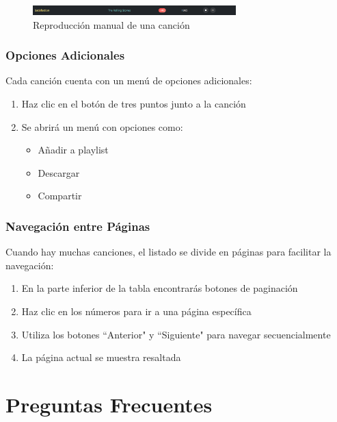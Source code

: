 \documentclass[a4paper,12pt]{article}
\begin{document}
\begin{figure}[h]
    \centering
    \includegraphics[width=0.7\textwidth]{imagenes/reproduccion_manual.png}
    \caption{Reproducción manual de una canción}
\end{figure}

\subsubsection{Opciones Adicionales}
Cada canción cuenta con un menú de opciones adicionales:

\begin{enumerate}
    \item Haz clic en el botón de tres puntos junto a la canción
    \item Se abrirá un menú con opciones como:
    \begin{itemize}
        \item Añadir a playlist
        \item Descargar
        \item Compartir
    \end{itemize}
\end{enumerate}

\subsubsection{Navegación entre Páginas}
Cuando hay muchas canciones, el listado se divide en páginas para facilitar la navegación:

\begin{enumerate}
    \item En la parte inferior de la tabla encontrarás botones de paginación
    \item Haz clic en los números para ir a una página específica
    \item Utiliza los botones ``Anterior" y ``Siguiente" para navegar secuencialmente
    \item La página actual se muestra resaltada
\end{enumerate}

\section{Preguntas Frecuentes}
\end{document}
